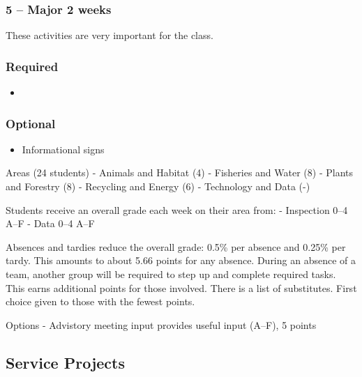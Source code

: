 \documentclass[letterpaper,10pt]{memoir}
\begin{document}
\subsubsection*{5 -- Major \hfill 2 weeks}
These activities are very important for the class. 



\subsubsection*{Required}
\begin{itemize}[nosep]
\item 
\end{itemize}

\subsubsection*{Optional}
\begin{itemize}[nosep]
\item Informational signs
\end{itemize}




Areas (24 students)
- Animals and Habitat	(4)
- Fisheries and Water	(8)
- Plants and Forestry	(8)
- Recycling and Energy	(6)
- Technology and Data	(-)

Students receive an overall grade each week on their area from:
- Inspection	0--4		A--F
- Data			0--4		A--F

Absences and tardies reduce the overall grade: 0.5\% per absence and 0.25\% per tardy. This amounts to about 5.66 points for any absence. During an absence of a team, another group will be required to step
up and complete required tasks. This earns additional points for those involved. There is a list of
substitutes. First choice given to those with the fewest points.

Options
- Advistory meeting input
	provides useful input (A--F), 5 points






\subsection*{Service Projects}


\end{document}
